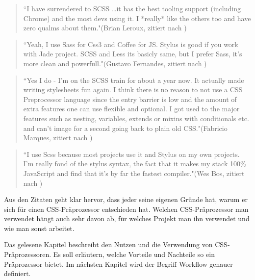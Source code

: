 \begin{quote}
``I have surrendered to SCSS …it has the best tooling support (including Chrome) and the most devs using it. I *really* like the others too and have zero qualms about them."(Brian Leroux, zitiert nach \cite[]{psdtowp.2014})
\end{quote} 
\begin{quote}
``Yeah, I use Sass for Css3 and Coffee for JS. Stylus is good if you work with Jade project. SCSS and Less its basicly same, but I prefer Sass, it's more clean and powerfull."(Gustavo Fernandes, zitiert nach \cite[]{psdtowp.2014})
\end{quote} 
\begin{quote}
``Yes I do - I’m on the SCSS train for about a year now. It actually made writing stylesheets fun again. I think there is no reason to not use a CSS Preprocessor language since the entry barrier is low and the amount of extra features one can use flexible and optional. I got used to the major features such as nesting, variables, extends or mixins with conditionals etc. and can’t image for a second going back to plain old CSS."(Fabricio Marques, zitiert nach \cite[]{psdtowp.2014})
\end{quote} 
\begin{quote}
``I use Scss because most projects use it and Stylus on my own projects. I'm really fond of the stylus syntax, the fact that it makes my stack 100\% JavaScript and find that it's by far the fastest compiler."(Wes Bos, zitiert nach \cite[]{psdtowp.2014})
\end{quote} 
Aus den Zitaten geht klar hervor, dass jeder seine eigenen Gründe hat, warum er sich für einen CSS-Präprozessor entschieden hat. \newline
Welchen CSS-Präprozessor man verwendet hängt auch sehr davon ab, für welches Projekt man ihn verwendet und wie man sonst arbeitet.\newline

Das gelesene Kapitel beschreibt den Nutzen und die Verwendung von CSS-Präprozessoren. Es soll erläutern, welche Vorteile und Nachteile so ein Präprozessor bietet. Im nächsten Kapitel wird der Begriff Workflow genauer definiert.
